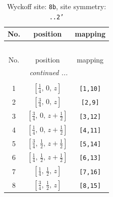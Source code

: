 \documentclass[fleqn,8pt]{jsarticle}
\begin{document}
\begin{longtable}{ccc}
\caption{Wyckoff site: {\tt 8b}, site symmetry: {\tt ..2'}}
 \\
 \hline \hline
No. & position & mapping \\ \hline \endfirsthead

\multicolumn{2}{l}{\tablename\ \thetable{}} \\
 \hline \hline
No. & position & mapping \\ \hline \endhead

 \hline \hline
\multicolumn{2}{r}{\footnotesize\it continued ...} \\ \endfoot

 \hline \hline
\multicolumn{2}{r}{} \\ \endlastfoot

1 & $\left[ \frac{1}{4},\, 0,\, z \right]$ & {\tt [1,10]} \\ \hline
2 & $\left[ \frac{3}{4},\, 0,\, z \right]$ & {\tt [2,9]} \\ \hline
3 & $\left[ \frac{3}{4},\, 0,\, z + \frac{1}{2} \right]$ & {\tt [3,12]} \\ \hline
4 & $\left[ \frac{1}{4},\, 0,\, z + \frac{1}{2} \right]$ & {\tt [4,11]} \\ \hline
5 & $\left[ \frac{3}{4},\, \frac{1}{2},\, z + \frac{1}{2} \right]$ & {\tt [5,14]} \\ \hline
6 & $\left[ \frac{1}{4},\, \frac{1}{2},\, z + \frac{1}{2} \right]$ & {\tt [6,13]} \\ \hline
7 & $\left[ \frac{1}{4},\, \frac{1}{2},\, z \right]$ & {\tt [7,16]} \\ \hline
8 & $\left[ \frac{3}{4},\, \frac{1}{2},\, z \right]$ & {\tt [8,15]} \\
\end{longtable}
\renewcommand{\arraystretch}{1.2}
\end{document}
